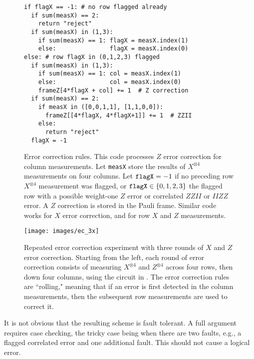\documentclass[10pt, twocolumn, aps, nofootinbib, longbibliography, nobibnotes, superscriptaddress]{revtex4-1} %
\begin{document}
\begin{figure}
\begin{verbatim}
if flagX == -1: # no row flagged already
  if sum(measX) == 2: 
    return "reject"
  if sum(measX) in (1,3): 
    if sum(measX) == 1: flagX = measX.index(1)
    else:               flagX = measX.index(0)
else: # row flagX in (0,1,2,3) flagged
  if sum(measX) in (1,3): 
    if sum(measX) == 1: col = measX.index(1)
    else:               col = measX.index(0)
    frameZ[4*flagX + col] += 1  # Z correction
  if sum(measX) == 2: 
    if measX in ([0,0,1,1], [1,1,0,0]): 
      frameZ[[4*flagX, 4*flagX+1]] += 1  # ZZII
    else: 
      return "reject"
  flagX = -1
\end{verbatim}
\caption{Error correction rules.  
This code processes $Z$ error correction for column measurements.  
Let {\tt measX} store the results of $X^{\otimes 4}$ measurements on four columns.  Let $\text{\tt{flagX}} = -1$ if no preceding row $X^{\otimes 4}$ measurement was flagged, or $\text{\tt flagX} \in \{0,1,2,3\}$ the flagged row with a possible weight-one $Z$ error or correlated $ZZII$ or $IIZZ$ error.  
A $Z$ correction is stored in the Pauli frame.  
Similar code works for $X$ error correction, and for row $X$ and $Z$ measurements.
} 
\label{f:errorcorrectionrules}
\end{figure}

\begin{figure*}
{\texttt{[image: images/ec\_3x]}}
\caption{Repeated error correction experiment with three rounds of $X$ and $Z$ error correction.  Starting from the left, each round of error correction consists of measuring $X^{\otimes 4}$ and $Z^{\otimes 4}$ across four rows, then down four columns, using the circuit in .  
The error correction rules are ``rolling," meaning that if an error is first detected in the column measurements, then the subsequent row measurements are used to correct it.}
\label{f:repeatederrorcorrection}
\end{figure*}

It is not obvious that the resulting scheme is fault tolerant.  A full argument requires case checking, the tricky case being when there are two faults, e.g., a flagged correlated error and one additional fault.  This should not cause a logical error.  
\end{document}
